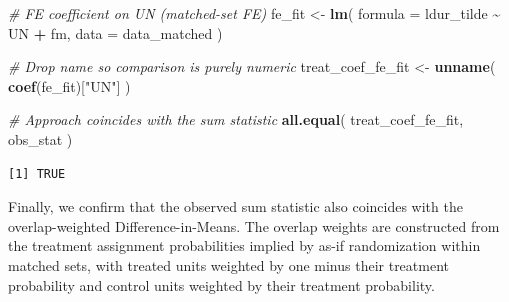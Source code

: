 \documentclass[
  12pt,
  leqno]{article}
\newenvironment{Shaded}{\begin{snugshade}}{\end{snugshade}}
\newcommand{\AttributeTok}[1]{\textcolor[rgb]{0.13,0.29,0.53}{#1}}
\newcommand{\CommentTok}[1]{\textcolor[rgb]{0.56,0.35,0.01}{\textit{#1}}}
\newcommand{\FunctionTok}[1]{\textcolor[rgb]{0.13,0.29,0.53}{\textbf{#1}}}
\newcommand{\NormalTok}[1]{#1}
\newcommand{\OtherTok}[1]{\textcolor[rgb]{0.56,0.35,0.01}{#1}}
\newcommand{\SpecialCharTok}[1]{\textcolor[rgb]{0.81,0.36,0.00}{\textbf{#1}}}
\newcommand{\StringTok}[1]{\textcolor[rgb]{0.31,0.60,0.02}{#1}}
\begin{document}
\singlespacing

\begin{Shaded}
\begin{Highlighting}[]
\CommentTok{\# FE coefficient on UN (matched{-}set FE)}
\NormalTok{fe\_fit }\OtherTok{\textless{}{-}} \FunctionTok{lm}\NormalTok{(}
  \AttributeTok{formula =}\NormalTok{ ldur\_tilde }\SpecialCharTok{\textasciitilde{}}\NormalTok{ UN }\SpecialCharTok{+}\NormalTok{ fm,}
  \AttributeTok{data =}\NormalTok{ data\_matched}
\NormalTok{)}

\CommentTok{\# Drop name so comparison is purely numeric}
\NormalTok{treat\_coef\_fe\_fit }\OtherTok{\textless{}{-}} \FunctionTok{unname}\NormalTok{(}
  \FunctionTok{coef}\NormalTok{(fe\_fit)[}\StringTok{"UN"}\NormalTok{]}
\NormalTok{)}

\CommentTok{\# Approach coincides with the sum statistic}
\FunctionTok{all.equal}\NormalTok{(}
\NormalTok{  treat\_coef\_fe\_fit, obs\_stat}
\NormalTok{)}
\end{Highlighting}
\end{Shaded}

\begin{verbatim}
[1] TRUE
\end{verbatim}

\doublespacing

Finally, we confirm that the observed sum statistic also coincides with
the overlap-weighted Difference-in-Means. The overlap weights are
constructed from the treatment assignment probabilities implied by as-if
randomization within matched sets, with treated units weighted by one
minus their treatment probability and control units weighted by their
treatment probability.

\singlespacing
\end{document}
